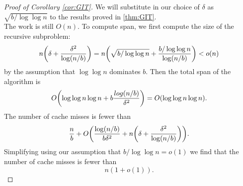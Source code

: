 \documentclass[sigconf]{acmart}
\DeclarePairedDelimiter{\paren}{(}{)}
\theoremstyle{remark}
\theoremstyle{remark}
\begin{document}
\begin{proof}[Proof of Corollary \ref{cor:GIT}]
	We will substitute in our choice of $\delta $ as $\sqrt{b/\log\log n}$ to the results proved in \ref{thm:GIT}. \\
	The work is still $O(n)$. To compute span, we first compute the size of the recursive subproblem:
	$$n\paren*{\delta+\frac{\delta^2}{\log (n/b)}} = n\paren*{\sqrt{b/\log\log n}+\frac{b/\log\log n}{\log (n/b)}} < o(n)$$
	by the assumption that $\log\log n$ dominates $b$.
	Then the total span of the algorithm is 
	$$O\paren*{\log \log n \log n + b\frac{log(n/b)}{\delta^2}} = O(\log \log n \log n).$$
	The number of cache misses is fewer than 
	$$\frac{n}{b}+O\paren*{\frac{\log (n/b)}{b\delta^2}  +n\paren*{\delta+\frac{\delta^2}{\log (n/b)}}}.$$ 
	Simplifying using our assumption that $b/\log\log n = o(1)$ we find that the number of cache misses is fewer than $$n(1+o(1)).$$
\end{proof}
\end{document}
